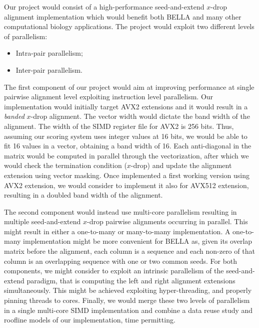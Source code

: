 \justify

Our project would consist of a high-performance seed-and-extend $x$-drop alignment implementation which would benefit both BELLA and many other computational biology applications.
The project would exploit two different levels of parallelism:
\begin{itemize}
	\item Intra-pair parallelism;
	\item Inter-pair parallelism.
\end{itemize}

The first component of our project would aim at improving performance at single pairwise alignment level exploiting instruction level parallelism. 	
Our implementation would initially target AVX2 extensions and it would result in a \textit{banded} $x$-drop alignment.
The vector width would dictate the band width of the alignment.
The width of the SIMD register file for AVX2 is 256 bits.
Thus, assuming our scoring system uses integer values at 16 bits, we would be able to fit 16 values in a vector, obtaining a band width of 16. 
Each anti-diagonal in the matrix would be computed in parallel through the vectorization, after which we would check the termination condition ($x$-drop) and update the alignment extension using vector masking. 	
Once implemented a first working version using AVX2 extension, we would consider to implement it also for AVX512 extension, resulting in a doubled band width of the alignment.

The second component would instead use multi-core parallelism resulting in multiple seed-and-extend $x$-drop pairwise alignments occurring in parallel. This might result in either a one-to-many or many-to-many implementation.
A one-to-many implementation might be more convenient for BELLA as, given its overlap matrix before the alignment, each column is a sequence and each non-zero of that column is an overlapping sequence with one or two common seeds.
For both components, we might consider to exploit an intrinsic parallelism of the seed-and-extend paradigm, that is computing the left and right alignment extensions simultaneously. This might be achieved exploiting hyper-threading, and properly pinning threads to cores.
Finally, we would merge these two levels of parallelism in a single multi-core SIMD implementation and combine a data reuse study and roofline models of our implementation, time permitting.

